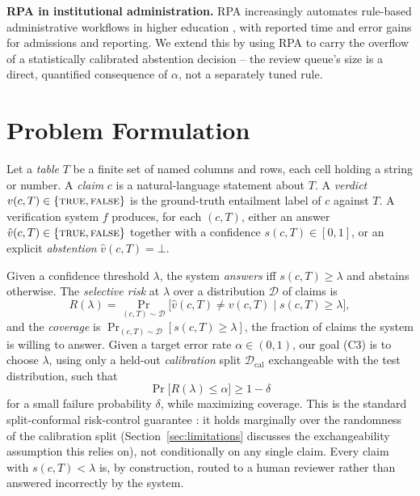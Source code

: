 \documentclass[journal]{IEEEtran}
\begin{document}
\textbf{RPA in institutional administration.} RPA increasingly automates
rule-based administrative workflows in higher education
\cite{bhardwaj2025rpa}, with reported time and error gains for admissions and
reporting. We extend this by using RPA to carry the overflow of a
statistically calibrated abstention decision -- the review queue's size is a
direct, quantified consequence of $\alpha$, not a separately tuned rule.

\section{Problem Formulation}
\label{sec:formulation}

Let a \emph{table} $T$ be a finite set of named columns and rows, each cell
holding a string or number. A \emph{claim} $c$ is a natural-language
statement about $T$. A \emph{verdict} $v(c,T)\in\{\textsc{true},
\textsc{false}\}$ is the ground-truth entailment label of $c$ against $T$.
A verification system $f$ produces, for each $(c,T)$, either an answer
$\hat v(c,T)\in\{\textsc{true},\textsc{false}\}$ together with a confidence
$s(c,T)\in[0,1]$, or an explicit \emph{abstention} $\hat v(c,T)=\bot$.

Given a confidence threshold $\lambda$, the system \emph{answers} iff
$s(c,T)\ge\lambda$ and abstains otherwise. The \emph{selective risk} at
$\lambda$ over a distribution $\mathcal D$ of claims is
\begin{equation}
R(\lambda) = \Pr_{(c,T)\sim\mathcal D}\big[\hat v(c,T)\neq v(c,T) \mid
s(c,T)\ge\lambda\big],
\end{equation}
and the \emph{coverage} is $\Pr_{(c,T)\sim\mathcal D}[s(c,T)\ge\lambda]$, the
fraction of claims the system is willing to answer. Given a target error
rate $\alpha\in(0,1)$, our goal (C3) is to choose $\lambda$, using only a
held-out \emph{calibration} split $\mathcal D_{\text{cal}}$ exchangeable
with the test distribution, such that
\begin{equation}
\Pr\big[R(\lambda) \le \alpha\big] \ge 1-\delta
\end{equation}
for a small failure probability $\delta$, while maximizing coverage. This is
the standard split-conformal risk-control guarantee
\cite{angelopoulos2024risk}: it holds marginally over the randomness of the
calibration split (Section~\ref{sec:limitations} discusses the
exchangeability assumption this relies on), not conditionally on any single
claim. Every claim with $s(c,T)<\lambda$ is, by construction, routed to a
human reviewer rather than answered incorrectly by the system.
\end{document}
